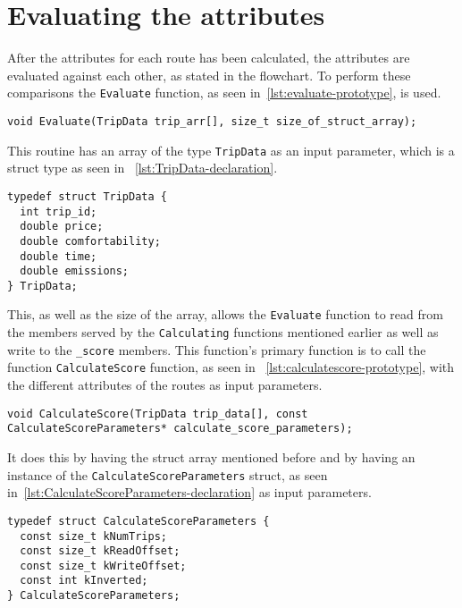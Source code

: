 \section{Evaluating the attributes}\label{sec:evaluating-the-attributes}

After the attributes for each route has been calculated, the attributes are evaluated against each other, as stated in
the flowchart.
To perform these comparisons the \texttt{Evaluate} function, as seen in~\ref{lst:evaluate-prototype}, is used.

\begin{lstlisting}[caption={Function prototype for \texttt{Evaluate}}, label={lst:evaluate-prototype}, captionpos=b]
void Evaluate(TripData trip_arr[], size_t size_of_struct_array);
\end{lstlisting}

This routine has an array of the type \texttt{TripData} as an input parameter, which is a struct type as seen in
~\ref{lst:TripData-declaration}.

\begin{lstlisting}[caption={Declaration of \texttt{TripData} struct}, label={lst:TripData-declaration}, captionpos=b]
typedef struct TripData {
  int trip_id;
  double price;
  double comfortability;
  double time;
  double emissions;
} TripData;
\end{lstlisting}

This, as well as the size of the array, allows the \texttt{Evaluate} function to read from the members served by the
\texttt{Calculating} functions mentioned earlier as well as write to the \texttt{\_score} members.
This function's primary function is to call the function \texttt{CalculateScore} function, as seen in
~\ref{lst:calculatescore-prototype}, with the different attributes of the routes as input parameters.

\begin{lstlisting}[caption={Function prototype for \texttt{CalculateScore}},label={lst:calculatescore-prototype},
    captionpos=b]
void CalculateScore(TripData trip_data[], const CalculateScoreParameters* calculate_score_parameters);
\end{lstlisting}

It does this by having the struct array mentioned before and by having an instance of the
\texttt{CalculateScoreParameters} struct, as seen in~\ref{lst:CalculateScoreParameters-declaration} as input parameters.

\begin{lstlisting}[caption={Declaration of \texttt{CalculateScoreParameters} struct},
    label={lst:CalculateScoreParameters-declaration}, captionpos=b]
typedef struct CalculateScoreParameters {
  const size_t kNumTrips;
  const size_t kReadOffset;
  const size_t kWriteOffset;
  const int kInverted;
} CalculateScoreParameters;
\end{lstlisting}


